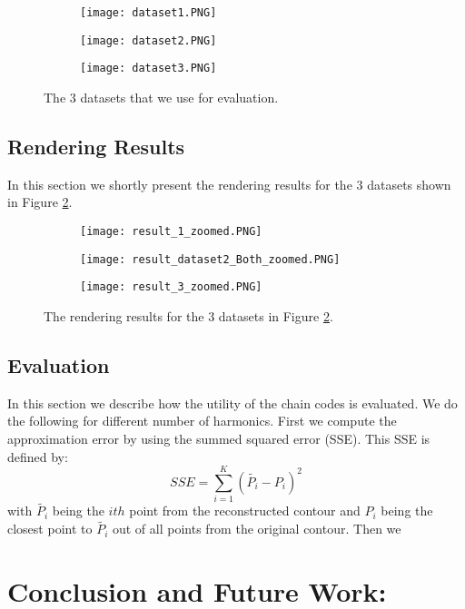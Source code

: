 \documentclass[thesis.tex]{subfiles}
\begin{document}
\begin{figure}[h]
\centering
\begin{subfigure}{0.30\textwidth}
		\texttt{[image: dataset1.PNG]}
	\caption{}		
	\end{subfigure}
\begin{subfigure}{0.30\textwidth}
		\texttt{[image: dataset2.PNG]}
	\caption{}		
	\end{subfigure}
\begin{subfigure}{0.30\textwidth}
		\texttt{[image: dataset3.PNG]}
	\caption{}		
	\end{subfigure}

\caption{The 3 datasets that we use for evaluation.}
\label{fig:datasets}
\end{figure}

\section{Rendering Results}

In this section we shortly present the rendering results for the 3 datasets shown in Figure \ref{fig:datasets}.
\begin{figure}[h]
\centering
\begin{subfigure}{0.30\textwidth}
		\texttt{[image: result\_1\_zoomed.PNG]}
	\caption{}		
	\end{subfigure}
\begin{subfigure}{0.30\textwidth}
		\texttt{[image: result\_dataset2\_Both\_zoomed.PNG]}
	\caption{}		
	\end{subfigure}
\begin{subfigure}{0.30\textwidth}
		\texttt{[image: result\_3\_zoomed.PNG]}
	\caption{}		
	\end{subfigure}

\caption{The rendering results for the 3 datasets in Figure \ref{fig:datasets}.}
\label{fig:datasets}
\end{figure}

\section{Evaluation}
In this section we describe how the utility of the chain codes is evaluated. We do the following for different number of harmonics.
First we compute the approximation error by using the summed squared error (SSE). This SSE is defined by: 
\begin{equation} \label{eq:sse}
 SSE = \sum_{i=1}^{K}(\tilde{P_i} - P_i)^2
\end{equation} 
with $\tilde{P_i}$ being the $ith$ point from the reconstructed contour and $P_i$ being the closest point to $\tilde{P_i}$ out of all points from the original contour.
Then we 

\chapter{Conclusion and Future Work:}\label{chap:basics}

\subfilebib %
\end{document}
